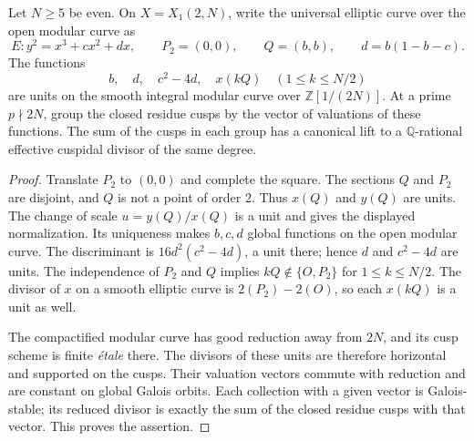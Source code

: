 \begin{lemma}\label{lem:octic-mixed2-unit-blocks}
Let $N\geq5$ be even. On $X=X_1(2,N)$, write the universal
elliptic curve over the open modular curve as
\[
 E:y^2=x^3+cx^2+dx,\qquad P_2=(0,0),\qquad Q=(b,b),
 \qquad d=b(1-b-c).
\]
The functions
\[
 b,\quad d,\quad c^2-4d,\quad x(kQ)\quad(1\leq k\leq N/2)
\]
are units on the smooth integral modular curve over
$\mathbb Z[1/(2N)]$. At a prime $p\nmid2N$, group the closed
residue cusps by the vector of valuations of these functions.
The sum of the cusps in each group has a canonical lift to a
$\mathbb Q$-rational effective cuspidal divisor of the same degree.
\end{lemma}
\begin{proof}
Translate $P_2$ to $(0,0)$ and complete the square. The sections
$Q$ and $P_2$ are disjoint, and $Q$ is not a point of order $2$.
Thus $x(Q)$ and $y(Q)$ are units. The change of scale
$u=y(Q)/x(Q)$ is a unit and gives the displayed normalization.
Its uniqueness makes $b,c,d$ global functions on the open
modular curve. The discriminant is
$16d^2(c^2-4d)$, a unit there; hence $d$ and $c^2-4d$ are units.
The independence of $P_2$ and $Q$ implies
$kQ\notin\{O,P_2\}$ for $1\leq k\leq N/2$.
The divisor of $x$ on a smooth elliptic curve is
$2(P_2)-2(O)$, so each $x(kQ)$ is a unit as well.

The compactified modular curve has good reduction away from $2N$,
and its cusp scheme is finite \emph{\'etale} there. The divisors of
these units are therefore horizontal and supported on the cusps.
Their valuation vectors commute with reduction and are constant
on global Galois orbits. Each collection with a given vector is
Galois-stable; its reduced divisor is exactly the sum of the
closed residue cusps with that vector. This proves the assertion.
\end{proof}
